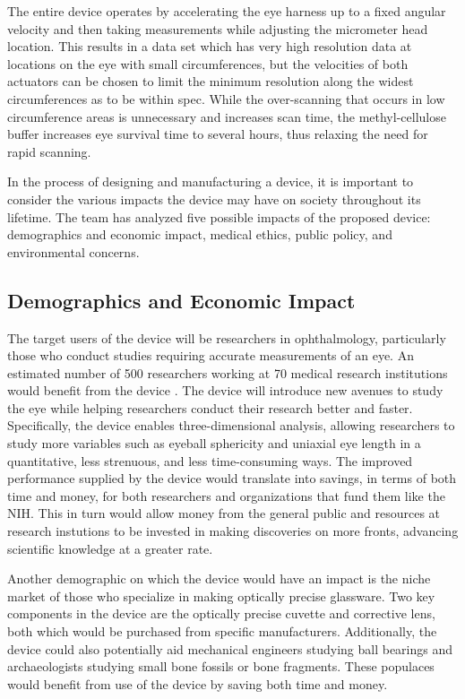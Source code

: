 \documentclass{article}
\begin{document}
The entire device operates by accelerating the eye harness up to a fixed angular velocity and then taking measurements while adjusting the micrometer head location. This results in a data set which has very high resolution data at locations on the eye with small circumferences, but the velocities of both actuators can be chosen to limit the minimum resolution along the widest circumferences as to be within spec. While the over-scanning that occurs in low circumference areas is unnecessary and increases scan time, the methyl-cellulose buffer increases eye survival time to several hours, thus relaxing the need for rapid scanning.
 
In the process of designing and manufacturing a device, it is important to consider the various impacts the device may have on society throughout its lifetime. The team has analyzed five possible impacts of the proposed device: demographics and economic impact, medical ethics, public policy, and environmental concerns. 
 
 
\subsection{Demographics and Economic Impact}
\label{sec:Demographics}
 
The target users of the device will be researchers in ophthalmology, particularly those who conduct studies requiring accurate measurements of an eye. An estimated number of 500 researchers working at 70 medical research institutions would benefit from the device \cite{Nickerson}. The device will introduce new avenues to study the eye while helping researchers conduct their research better and faster. Specifically, the device enables three-dimensional analysis, allowing researchers to study more variables such as eyeball sphericity and uniaxial eye length in a quantitative, less strenuous, and less time-consuming ways. The improved performance supplied by the device would translate into savings, in terms of both time and money, for both researchers and organizations that fund them like the NIH. This in turn would allow money from the general public and resources at research instutions to be invested in making discoveries on more fronts, advancing scientific knowledge at a greater rate. 
 
Another demographic on which the device would have an impact is the niche market of those who specialize in making optically precise glassware. Two key components in the device are the optically precise cuvette and corrective lens, both which would be purchased from specific manufacturers. Additionally, the device could also potentially aid mechanical engineers studying ball bearings and archaeologists studying small bone fossils or bone fragments. These populaces would benefit from use of the device by saving both time and money. 
\end{document}
